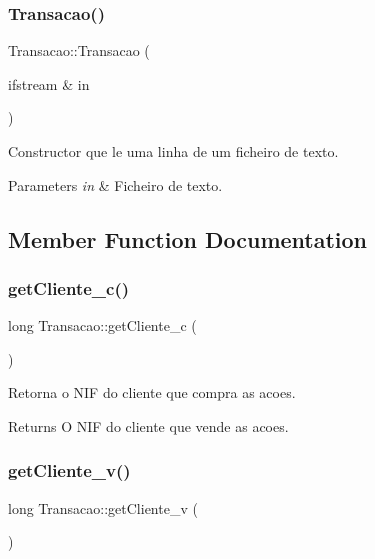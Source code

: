 \subsubsection{\texorpdfstring{Transacao()}{Transacao()}\hspace{0.1cm}{\footnotesize\ttfamily [2/2]}}
{\footnotesize\ttfamily Transacao\+::\+Transacao (\begin{DoxyParamCaption}\item[{ifstream \&}]{in }\end{DoxyParamCaption})}



Constructor que le uma linha de um ficheiro de texto. 


\begin{DoxyParams}{Parameters}
{\em in} & Ficheiro de texto. \\
\hline
\end{DoxyParams}


\subsection{Member Function Documentation}
\hypertarget{class_transacao_ad896abaa081d1407b69f8bd9a60b107c}{}\label{class_transacao_ad896abaa081d1407b69f8bd9a60b107c} 
\subsubsection{\texorpdfstring{get\+Cliente\+\_\+c()}{getCliente\_c()}}
{\footnotesize\ttfamily long Transacao\+::get\+Cliente\+\_\+c (\begin{DoxyParamCaption}{ }\end{DoxyParamCaption})}



Retorna o N\+IF do cliente que compra as acoes. 

\begin{DoxyReturn}{Returns}
O N\+IF do cliente que vende as acoes. 
\end{DoxyReturn}
\hypertarget{class_transacao_a67521a6dea9a82ca2d7d3821a10a6e0d}{}\label{class_transacao_a67521a6dea9a82ca2d7d3821a10a6e0d} 
\subsubsection{\texorpdfstring{get\+Cliente\+\_\+v()}{getCliente\_v()}}
{\footnotesize\ttfamily long Transacao\+::get\+Cliente\+\_\+v (\begin{DoxyParamCaption}{ }\end{DoxyParamCaption})}



